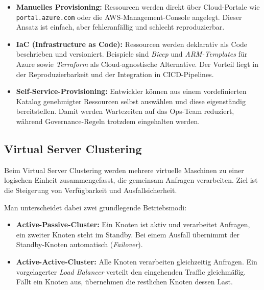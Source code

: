 \begin{itemize}
    \item \textbf{Manuelles Provisioning:} Ressourcen werden direkt über
    Cloud-Portale wie \texttt{portal.azure.com} oder die AWS-Management-Console
    angelegt. Dieser Ansatz ist einfach, aber fehleranfällig und schlecht
    reproduzierbar.

    \item \textbf{IaC (Infrastructure as Code):} Ressourcen werden
    deklarativ als Code beschrieben und versioniert. Beispiele sind
    \textit{Bicep} und \textit{ARM-Templates} für Azure sowie
    \textit{Terraform} als Cloud-agnostische Alternative. Der Vorteil liegt in
    der Reproduzierbarkeit und der Integration in CICD-Pipelines.

    \item \textbf{Self-Service-Provisioning:} Entwickler können aus einem
    vordefinierten Katalog genehmigter Ressourcen selbst auswählen und diese
    eigenständig bereitstellen. Damit werden Wartezeiten auf das Ops-Team
    reduziert, während Governance-Regeln trotzdem eingehalten werden.
\end{itemize}

\subsection{Virtual Server Clustering}
Beim Virtual Server Clustering werden mehrere virtuelle Maschinen zu einer
logischen Einheit zusammengefasst, die gemeinsam Anfragen verarbeiten.
Ziel ist die Steigerung von Verfügbarkeit und Ausfallsicherheit.

Man unterscheidet dabei zwei grundlegende Betriebsmodi:

\begin{itemize}
    \item \textbf{Active-Passive-Cluster:} Ein Knoten ist aktiv und verarbeitet
    Anfragen, ein zweiter Knoten steht im Standby. Bei einem Ausfall übernimmt
    der Standby-Knoten automatisch (\textit{Failover}).

    \item \textbf{Active-Active-Cluster:} Alle Knoten verarbeiten gleichzeitig
    Anfragen. Ein vorgelagerter \textit{Load Balancer} verteilt den eingehenden
    Traffic gleichmäßig. Fällt ein Knoten aus, übernehmen die restlichen
    Knoten dessen Last.
\end{itemize}

